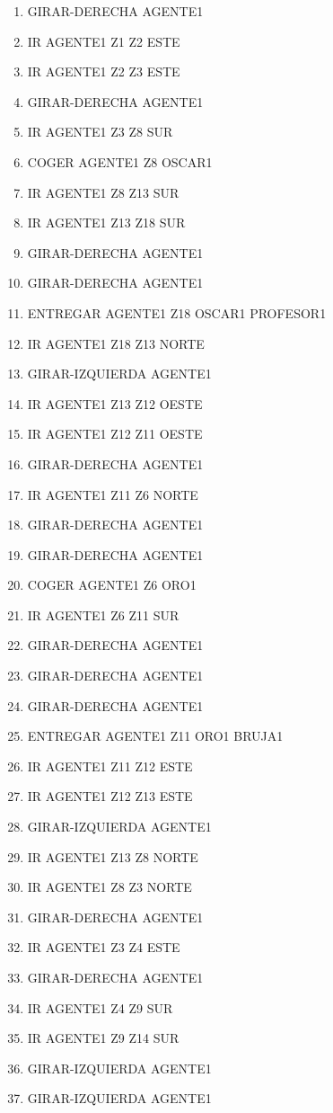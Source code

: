 \documentclass[12pt,a4paper]{article}
\begin{document}
\begin{enumerate}
	\item GIRAR-DERECHA AGENTE1
	\item IR AGENTE1 Z1 Z2 ESTE
	\item IR AGENTE1 Z2 Z3 ESTE
	\item GIRAR-DERECHA AGENTE1
	\item IR AGENTE1 Z3 Z8 SUR
	\item COGER AGENTE1 Z8 OSCAR1
	\item IR AGENTE1 Z8 Z13 SUR
	\item IR AGENTE1 Z13 Z18 SUR
	\item GIRAR-DERECHA AGENTE1
	\item GIRAR-DERECHA AGENTE1
	\item ENTREGAR AGENTE1 Z18 OSCAR1 PROFESOR1
	\item IR AGENTE1 Z18 Z13 NORTE
	\item GIRAR-IZQUIERDA AGENTE1
	\item IR AGENTE1 Z13 Z12 OESTE
	\item IR AGENTE1 Z12 Z11 OESTE
	\item GIRAR-DERECHA AGENTE1
	\item IR AGENTE1 Z11 Z6 NORTE
	\item GIRAR-DERECHA AGENTE1
	\item GIRAR-DERECHA AGENTE1
	\item COGER AGENTE1 Z6 ORO1
	\item IR AGENTE1 Z6 Z11 SUR
	\item GIRAR-DERECHA AGENTE1
	\item GIRAR-DERECHA AGENTE1
	\item GIRAR-DERECHA AGENTE1
	\item ENTREGAR AGENTE1 Z11 ORO1 BRUJA1
	\item IR AGENTE1 Z11 Z12 ESTE
	\item IR AGENTE1 Z12 Z13 ESTE
	\item GIRAR-IZQUIERDA AGENTE1
	\item IR AGENTE1 Z13 Z8 NORTE
	\item IR AGENTE1 Z8 Z3 NORTE
	\item GIRAR-DERECHA AGENTE1
	\item IR AGENTE1 Z3 Z4 ESTE
	\item GIRAR-DERECHA AGENTE1
	\item IR AGENTE1 Z4 Z9 SUR
	\item IR AGENTE1 Z9 Z14 SUR
	\item GIRAR-IZQUIERDA AGENTE1
	\item GIRAR-IZQUIERDA AGENTE1

\end{enumerate}
\end{document}
